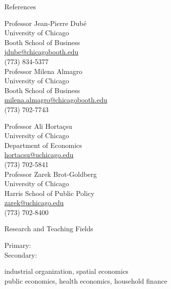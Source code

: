 \documentclass{resume} %
\begin{document}
	
	\begin{rSection}{References}	
		\begin{minipage}[t]{0.5\textwidth}
			Professor Jean-Pierre Dub\'e \\ %
			University of Chicago \\
			Booth School of Business \\
			\href{mailto:jdube@chicagobooth.edu}{jdube@chicagobooth.edu}\\
			(773) 834-5377 \\
			
			Professor Milena Almagro \\
			University of Chicago \\
			Booth School of Business \\
			\href{mailto:milena.almagro@chicagobooth.edu}{milena.almagro@chicagobooth.edu}\\
			(773) 702-7743
		\end{minipage}
		\begin{minipage}[t]{0.5\textwidth}
			Professor Ali Horta\c{c}su \\
			University of Chicago \\
			Department of Economics \\
			\href{mailto:hortacsu@uchicago.edu}{hortacsu@uchicago.edu}\\
			(773) 702-5841 \\
			
			Professor Zarek Brot-Goldberg \\
			University of Chicago \\
			Harris School of Public Policy \\
			\href{mailto:zarek@uchicago.edu}{zarek@uchicago.edu} \\
			(773) 702-8400
		\end{minipage}
	\end{rSection}

	\begin{rSection}{Research and Teaching Fields}
		\begin{minipage}[t]{0.125\textwidth}
			Primary: \\
			Secondary:
		\end{minipage}
		\begin{minipage}[t]{0.875\textwidth}
			industrial organization, spatial economics \\
			public economics, health economics, household finance
		\end{minipage}
	\end{rSection}
\end{document}
